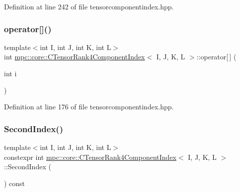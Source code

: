Definition at line 242 of file tensorcomponentindex.\+hpp.

\mbox{\label{classmpc_1_1core_1_1_c_tensor_rank4_component_index_a7553f47e436776486fa6775308ee7c9f}} 
\subsubsection{\texorpdfstring{operator[]()}{operator[]()}}
{\footnotesize\ttfamily template$<$int I, int J, int K, int L$>$ \\
int \mbox{\hyperlink{classmpc_1_1core_1_1_c_tensor_rank4_component_index}{mpc\+::core\+::\+C\+Tensor\+Rank4\+Component\+Index}}$<$ I, J, K, L $>$\+::operator\mbox{[}$\,$\mbox{]} (\begin{DoxyParamCaption}\item[{int}]{i }\end{DoxyParamCaption})\hspace{0.3cm}{\ttfamily [inline]}}



Definition at line 176 of file tensorcomponentindex.\+hpp.

\mbox{\label{classmpc_1_1core_1_1_c_tensor_rank4_component_index_ad1904a0c34a510646edf7f02f8a43eb2}} 
\subsubsection{\texorpdfstring{Second\+Index()}{SecondIndex()}}
{\footnotesize\ttfamily template$<$int I, int J, int K, int L$>$ \\
constexpr int \mbox{\hyperlink{classmpc_1_1core_1_1_c_tensor_rank4_component_index}{mpc\+::core\+::\+C\+Tensor\+Rank4\+Component\+Index}}$<$ I, J, K, L $>$\+::Second\+Index (\begin{DoxyParamCaption}{ }\end{DoxyParamCaption}) const\hspace{0.3cm}{\ttfamily [inline]}}




